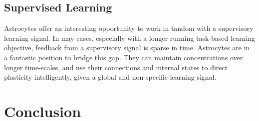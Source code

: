 \section{Supervised Learning}

Astrocytes offer an interesting opportunity to work in tandom with a supervisory
learning signal. In may cases, especially with a longer running task-based
learning objective, feedback from a supervisory signal is sparse in
time. Astrocytes are in a fantastic position to bridge this gap. They can
maintain \ca concentrations over longer time-scales, and use their connections
and internal states to direct plasticity intelligently, given a global and
non-specific learning signal.

\chapter{Conclusion} \label{chapter:conclusion}

